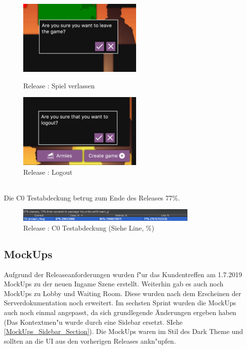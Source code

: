 \documentclass[12pt, titlepage]{scrartcl}
\newcommand{\RN}[1]{%
	\textup{\uppercase\expandafter{\romannumeral#1}}%
}
\begin{document}
		        \begin{figure}[H]
                    \centering
                    \begin{minipage}{0.55\textwidth}
                        \centering
                        \includegraphics[width=0.55\textwidth]{images/old_state/additional/LeaveGame.png}
                        \caption{Release \RN{2}: Spiel verlassen}
                        \label{Leave_Game}
                    \end{minipage}%
                    \begin{minipage}{0.55\textwidth}
                        \centering
                        \includegraphics[width=0.55\textwidth]{images/old_state/additional/Logout.png}
                        \caption{Release \RN{2}: Logout}
                        \label{Logout}
                    \end{minipage}
                \end{figure}
                \ \\ Die C0 Testabdeckung betrug zum Ende des Releases \RN{2} 77\%.
                \begin{figure}[H] 
    				\centering
    				\includegraphics[width=0.8\textwidth]{images/old_state/Coverage.png}
    				\caption{Release \RN{2}: C0 Testabdeckung (Siehe Line, \%)}
    				\label{Coverage}
			    \end{figure}
	    \subsection{MockUps}
	        Aufgrund der Releaseanforderungen wurden f"ur das Kundentreffen am 1.7.2019 MockUps zu der neuen Ingame Szene erstellt. Weiterhin gab es auch noch MockUps zu Lobby und Waiting Room. Diese wurden nach dem Erscheinen der Serverdokumentation noch erweitert. Im sechsten Sprint wurden die MockUps auch noch einmal angepasst, da sich grundlegende \"Anderungen ergeben haben (Das Kontextmen"u wurde durch eine Sidebar ersetzt. SIehe \ref{MockUps_Sidebar_Section}). Die MockUps waren im Stil des Dark Theme und sollten an die UI aus den vorherigen Releases ankn"upfen.
\end{document}
